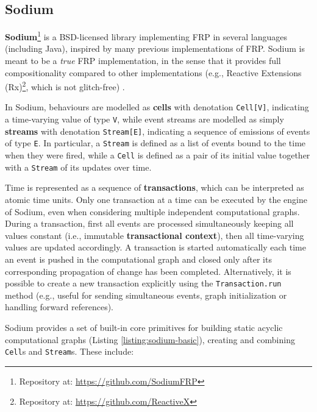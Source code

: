 
\subsection{Sodium}
\label{section:background:technologies:sodium}

\textbf{Sodium}\footnote{Repository at: \url{https://github.com/SodiumFRP}} is a
BSD-licensed library implementing \ac{FRP} in several languages (including
Java), inspired by many previous implementations of \ac{FRP}. Sodium
is meant to be a \textit{true} \ac{FRP} implementation, in the sense that it
provides full compositionality compared to other implementations (e.g., Reactive
Extensions (Rx)\footnote{Repository at: \url{https://github.com/ReactiveX}},
which is not glitch-free) \cite{FRP}.

In Sodium, behaviours are modelled as \textbf{cells} with denotation
\texttt{Cell[V]}, indicating a time-varying value of type \texttt{V}, while
event streams are modelled as simply \textbf{streams} with denotation
\texttt{Stream[E]}, indicating a sequence of emissions of events of type
\texttt{E}. In particular, a \texttt{Stream} is defined as a list of events
bound to the time when they were fired, while a \texttt{Cell} is defined as a
pair of its initial value together with a \texttt{Stream} of its updates over
time.

Time is represented as a sequence of \textbf{transactions}, which can be
interpreted as atomic time units. Only one transaction at a time can be
executed by the engine of Sodium, even when considering multiple independent
computational graphs. During a transaction, first all events are processed
simultaneously keeping all values constant (i.e., immutable
\textbf{transactional context}), then all time-varying values are updated
accordingly. A transaction is started automatically each time an event is
pushed in the computational graph and closed only after its corresponding
propagation of change has been completed. Alternatively, it is possible to
create a new transaction explicitly using the \texttt{Transaction.run} method
(e.g., useful for sending simultaneous events, graph initialization or handling
forward references).

Sodium provides a set of built-in core primitives for building static acyclic
computational graphs (Listing \ref{listing:sodium-basic}), creating and
combining \texttt{Cell}s and \texttt{Stream}s. These include:

